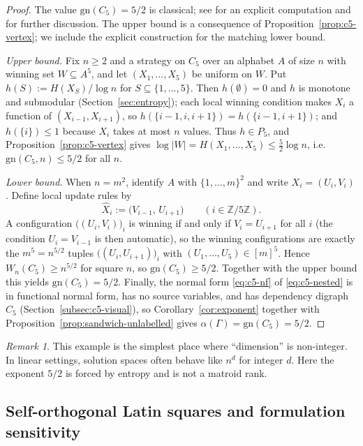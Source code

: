\documentclass[11pt]{article}
\theoremstyle{plain}
\theoremstyle{definition}
\theoremstyle{definition}
\theoremstyle{remark}
\newtheorem{remark}[theorem]{Remark}
\newcommand{\A}{A}
\newcommand{\gn}{\mathrm{gn}}
\begin{document}
\begin{proof}
The value $\gn(C_5)=5/2$ is classical; see \cite[Section~5]{riis2007graphentropy} for an
explicit computation and \cite{christofides2011guessing,gadouleau2011graph} for further discussion.
The upper bound is a consequence of Proposition~\ref{prop:c5-vertex}; we include the explicit
construction for the matching lower bound.

\smallskip
\noindent\emph{Upper bound.}
Fix $n\ge 2$ and a strategy on $C_5$ over an alphabet $\A$ of size $n$ with winning set
$W\subseteq\A^5$, and let $(X_1,\dots,X_5)$ be uniform on $W$.
Put $h(S):=H(X_S)/\log n$ for $S\subseteq\{1,\dots,5\}$.
Then $h(\emptyset)=0$ and $h$ is monotone and submodular (Section~\ref{sec:entropy}); each
local winning condition makes $X_i$ a function of $(X_{i-1},X_{i+1})$, so
$h(\{i-1,i,i+1\})=h(\{i-1,i+1\})$; and $h(\{i\})\le 1$ because $X_i$ takes at most $n$ values.
Thus $h\in P_5$, and Proposition~\ref{prop:c5-vertex} gives
$\log|W|=H(X_1,\dots,X_5)\le\tfrac52\log n$, i.e.\ $\gn(C_5,n)\le 5/2$ for all $n$.

\smallskip
\noindent\emph{Lower bound.}
When $n=m^2$, identify $\A$ with $\{1,\dots,m\}^2$ and write $X_i=(U_i,V_i)$.
Define local update rules by
\[
  \widehat X_i:=\bigl(V_{i-1},\,U_{i+1}\bigr)\qquad (i\in \mathbb Z/5\mathbb Z).
\]
A configuration $\bigl((U_i,V_i)\bigr)_i$ is winning if and only if $V_i=U_{i+1}$ for all $i$
(the condition $U_i=V_{i-1}$ is then automatic), so the winning configurations are exactly the
$m^5=n^{5/2}$ tuples $\bigl((U_i,U_{i+1})\bigr)_i$ with $(U_1,\dots,U_5)\in[m]^5$.
Hence $W_n(C_5)\ge n^{5/2}$ for square $n$, so $\gn(C_5)\ge 5/2$.
Together with the upper bound this yields $\gn(C_5)=5/2$.
Finally, the normal form \eqref{eq:c5-nf} of \eqref{eq:c5-nested} is in functional normal form,
has no source variables, and has dependency digraph $C_5$ (Section~\ref{subsec:c5-visual}), so
Corollary~\ref{cor:exponent} together with Proposition~\ref{prop:sandwich-unlabelled} gives
$\alpha(\Gamma)=\gn(C_5)=5/2$.
\end{proof}

\begin{remark}
This example is the simplest place where ``dimension'' is non-integer.
In linear settings, solution spaces often behave like $n^d$ for integer $d$.
Here the exponent $5/2$ is forced by entropy and is not a matroid rank.
\end{remark}

\subsection{Self-orthogonal Latin squares and formulation sensitivity}
\label{subsec:sols}
\end{document}
